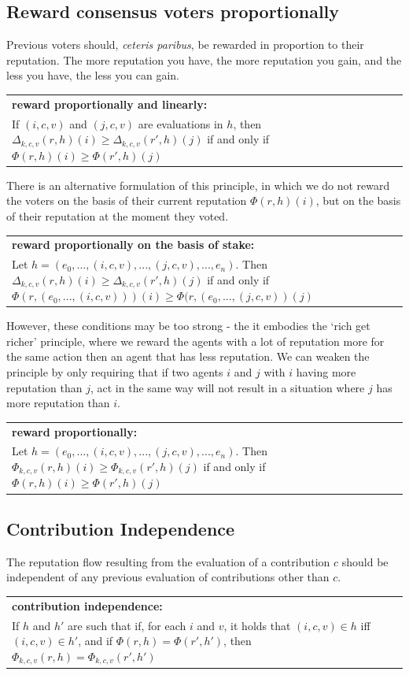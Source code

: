 \documentclass{article}
\newcommand{\flow}{\Phi}
\newenvironment{condition}[1]
	{
	\begin{center}
	   \begin{tabular}{|p{.9\textwidth}|}
		\hline \medskip
		{\bf #1:}\\
	}
	{
		\medskip \\\hline
	\end{tabular}
	\end{center}
	}
\begin{document}
\subsection{Reward consensus voters proportionally}
Previous voters should, {\em ceteris paribus}, be rewarded in proportion to their reputation. The more reputation you have, the more reputation you gain, and the less you have, the less you can gain.
\begin{condition}{reward proportionally and linearly}
If $(i, c, v)$  and $(j, c, v)$ are evaluations in $h$, then $\Delta_{k, c, v}(r, h)(i) \geq \Delta_{k,c,v}(r', h)(j)$ if and only if $\flow(r, h)(i) \geq \flow(r', h)(j)$
\end{condition}
There is an alternative formulation of this principle, in which we do not reward the voters on the basis of their current reputation $\flow(r, h)(i)$, but on the basis of their reputation at the moment they voted.
\begin{condition}{reward proportionally on the basis of stake}
Let $h = (e_0, ..., (i, c, v), ..., (j, c, v), ..., e_n)$. Then $\Delta_{k, c, v}(r, h)(i) \geq \Delta_{k,c,v}(r', h)(j)$ if and only if $\flow(r, (e_0, ..., (i,c,v)))(i) \geq \flow(r, (e_0, ..., (j, c, v))(j)$ 
\end{condition}
However, these conditions may be too strong - the  it embodies the `rich get richer' principle, where we reward the agents with a lot of reputation more for the same action then an agent that has less reputation. We can weaken the principle by only requiring that if two agents $i$ and $j$ with $i$ having more reputation than $j$, act in the same way will not result in a situation where $j$ has more reputation than $i$.
\begin{condition}{reward proportionally}
Let $h = (e_0, ..., (i, c, v), ..., (j, c, v), ..., e_n)$. Then $\flow_{k, c, v}(r, h)(i) \geq \flow_{k,c,v}(r', h)(j)$ if and only if $\flow(r, h)(i) \geq \flow(r', h)(j)$ 
\end{condition}

\subsection{Contribution Independence}

The reputation flow resulting from the evaluation of a contribution $c$ should be independent of any previous evaluation of contributions other than $c$.
\begin{condition}{contribution independence}
If $h$ and $h'$ are such that 
if, for each $i$ and $v$, it holds that $(i, c, v)  \in h$ iff  $(i, c, v) \in h'$, and if $\flow(r, h) = \flow(r', h')$, then
$\flow_{k,c,v}(r, h) = \flow_{k,c,v}(r', h')$
\end{condition}
\end{document}
